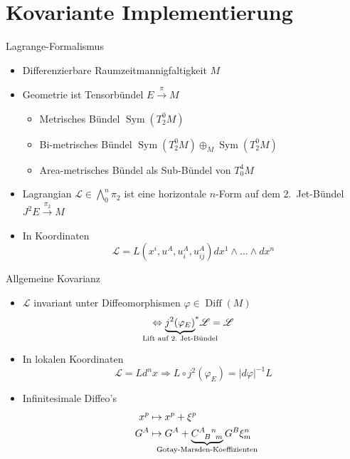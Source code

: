 \documentclass{beamer}
\newcommand{\gmc}[4]{\ensuremath{C^{#1\hphantom{#2}#3}_{\hphantom{#1}{#2}\hphantom{#3}#4}}}
\begin{document}
    \section{Kovariante Implementierung}\label{sec:covariant-constructive-gravity}

    \begin{frame}{Lagrange-Formalismus}
        \begin{itemize}
            \item Differenzierbare Raumzeitmannigfaltigkeit $M$
            \item Geometrie ist Tensorbündel $E \xrightarrow{\pi} M$
            \begin{itemize}
                \item Metrisches Bündel $\operatorname{Sym}(T^0_2 M)$
                \item Bi-metrisches Bündel $\operatorname{Sym}(T^0_2 M) \oplus_M \operatorname{Sym}(T^0_2 M)$
                \item Area-metrisches Bündel als Sub-Bündel von $T^4_0 M$
            \end{itemize}
            \item Lagrangian $\mathscr L \in \bigwedge^n_0 \pi_2$ ist eine horizontale $n$-Form auf dem
            2.\ Jet-Bündel $J^2 E \xrightarrow{\pi_2} M$
            \item In Koordinaten
            \[ \mathscr{L} = L(x^i, u^A, u^A_i, u^A_{ij}) dx^1 \wedge \dots \wedge dx^n \]
        \end{itemize}
    \end{frame}

    \begin{frame}{Allgemeine Kovarianz}
        \begin{itemize}
            \item $\mathscr L$ invariant unter Diffeomorphismen $\varphi\in\operatorname{Diff}(M)$
            \[ \Leftrightarrow {\underbrace{j^2(\varphi_E)}_{\mathclap{\text{Lift auf 2.\ Jet-Bündel}}}}^\ast\mathscr{L} = \mathscr{L} \]
            \item In lokalen Koordinaten
            \[ \mathscr L = L d^n x\Rightarrow L\circ j^2(\varphi_E) = \lvert d\varphi\rvert^{-1} L \]
            \item Infinitesimale Diffeo's
            \begin{align*}
                x^p &\mapsto x^p + \xi^p \\
                G^A &\mapsto G^A + \underbrace{\gmc{A}{B}{n}{m}}_{\mathclap{\text{Gotay-Marsden-Koeffizienten}}} G^B \xi^n_m
            \end{align*}
        \end{itemize}
    \end{frame}
\end{document}
